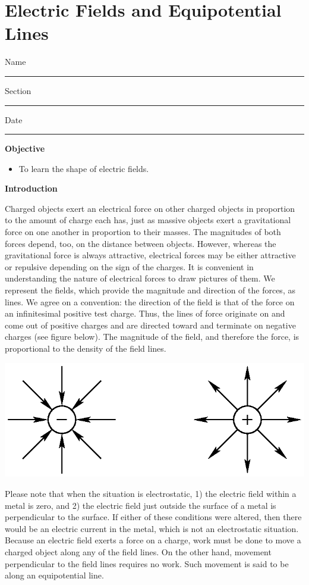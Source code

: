 
\section{Electric Fields and Equipotential Lines}

Name \rule{2.0in}{0.1pt}\hfill{}Section \rule{1.0in}{0.1pt}\hfill{}Date
\rule{1.0in}{0.1pt}

\textbf{Objective}

\begin{itemize}
\item To learn the shape of electric fields.
\end{itemize}
\textbf{Introduction}

Charged objects exert an electrical force on other charged objects
in proportion to the amount of charge each has, just as massive objects
exert a gravitational force on one another in proportion to their
masses. The magnitudes of both forces depend, too, on the distance
between objects. However, whereas the gravitational force is always
attractive, electrical forces may be either attractive or repulsive
depending on the sign of the charges. It is convenient in understanding
the nature of electrical forces to draw pictures of them. We represent
the fields, which provide the magnitude and direction of the forces,
as lines. We agree on a convention: the direction of the field is
that of the force on an infinitesimal positive test charge. Thus,
the lines of force originate on and come out of positive charges and
are directed toward and terminate on negative charges (see figure
below). The magnitude of the field, and therefore the force, is proportional
to the density of the field lines.

\vspace{0.3cm}
{\centering \includegraphics{ef_equipot_lines_fig_1.eps} \par}
\vspace{0.3cm}

Please note that when the situation is electrostatic, 1) the electric
field within a metal is zero, and 2) the electric field just outside
the surface of a metal is perpendicular to the surface. If either
of these conditions were altered, then there would be an electric
current in the metal, which is not an electrostatic situation. Because
an electric field exerts a force on a charge, work must be done to move a
charged object along any of the field lines. On the other hand, movement
perpendicular to the field lines requires no work. Such movement is
said to be along an equipotential line.

